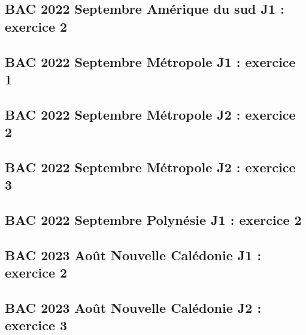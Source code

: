 \documentclass[lang=fr,edition=teacher,layout=sheet]{mxbook}
\begin{document}
\begingroup\endgroup
\par\bigskip
{}\subsection*{BAC 2022 Septembre Amérique du sud J1 : exercice 2}
\begingroup\endgroup
\par\bigskip
{}\subsection*{BAC 2022 Septembre Métropole J1 : exercice 1}
\begingroup\endgroup
\par\bigskip
{}\subsection*{BAC 2022 Septembre Métropole J2 : exercice 2}
\begingroup\endgroup
\par\bigskip
{}\subsection*{BAC 2022 Septembre Métropole J2 : exercice 3}
\begingroup\endgroup
\par\bigskip
{}\subsection*{BAC 2022 Septembre Polynésie J1 : exercice 2}
\begingroup\endgroup
\par\bigskip
{}\subsection*{BAC 2023 Août Nouvelle Calédonie J1 : exercice 2}
\begingroup\endgroup
\par\bigskip
{}\subsection*{BAC 2023 Août Nouvelle Calédonie J2 : exercice 3}
\end{document}
